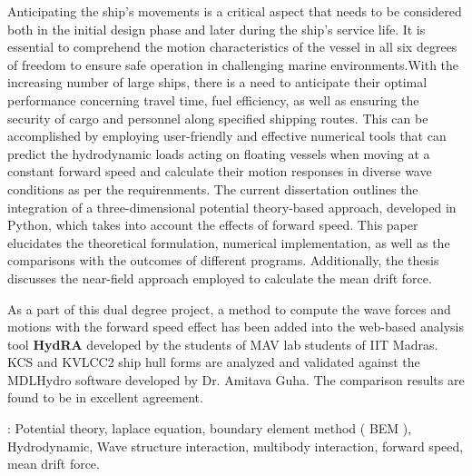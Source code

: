 \abstract
Anticipating the ship's movements is a critical aspect that needs to be considered both in 
the initial design phase and later during the ship's service life. It is essential to 
comprehend the motion characteristics of the vessel in all six degrees of freedom to 
ensure safe operation in challenging marine environments.With the increasing number of large ships,
there is a need to anticipate their optimal performance concerning travel time, fuel efficiency, 
as well as ensuring the security of cargo and personnel along specified shipping routes. 
This can be accomplished by employing user-friendly and effective numerical tools that can 
predict the hydrodynamic loads acting on floating vessels when moving at a constant forward 
speed and calculate their motion responses in diverse wave conditions as per the requirenments. 
The current dissertation outlines the integration of a three-dimensional potential theory-based 
approach, developed in Python, which takes into account the effects of forward speed. 
This paper elucidates the theoretical formulation, numerical implementation, as well as the 
comparisons with the outcomes of different programs. Additionally, the thesis discusses the 
near-field approach employed to calculate the mean drift force.

As a part of this dual degree project, a method to compute the wave forces and motions with 
the forward speed effect has been added into the web-based analysis tool {\bf HydRA} developed by 
the students of MAV lab students of IIT Madras. KCS and KVLCC2 ship hull forms are analyzed 
and validated against the MDLHydro software developed by Dr. Amitava Guha. 
The comparison results are found to be in excellent agreement.

 : Potential theory, laplace equation, boundary element method ( BEM ), 
Hydrodynamic, Wave structure interaction, multibody interaction, forward speed, mean drift force.